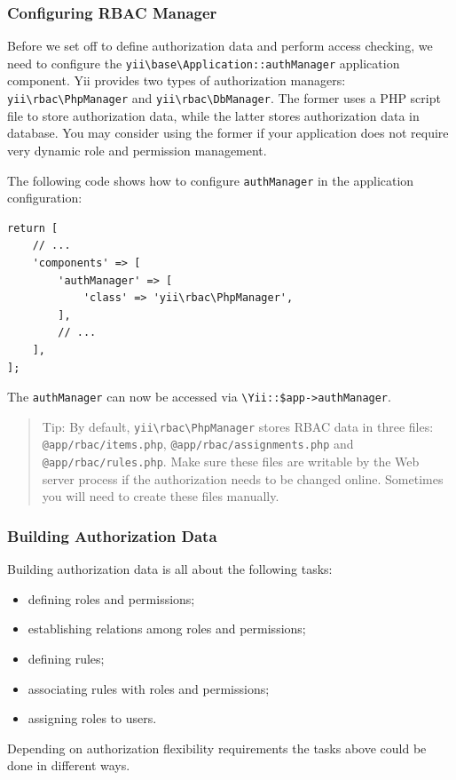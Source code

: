 \subsubsection{Configuring RBAC Manager}
Before we set off to define authorization data and perform access checking, we need to configure the
\texttt{yii{\allowbreak{}\textbackslash}base{\allowbreak{}\textbackslash}Application\allowbreak{}::\allowbreak{}authManager} application component. Yii provides two types of authorization managers:
\texttt{yii{\allowbreak{}\textbackslash}rbac{\allowbreak{}\textbackslash}PhpManager} and \texttt{yii{\allowbreak{}\textbackslash}rbac{\allowbreak{}\textbackslash}DbManager}. The former uses a PHP script file to store authorization
data, while the latter stores authorization data in database. You may consider using the former if your application
does not require very dynamic role and permission management.

The following code shows how to configure \lstinline|authManager| in the application configuration:

\lstset{language=php}\begin{lstlisting}
return [
    // ...
    'components' => [
        'authManager' => [
            'class' => 'yii\rbac\PhpManager',
        ],
        // ...
    ],
];
\end{lstlisting}
The \lstinline|authManager| can now be accessed via \lstinline|\Yii::$app->authManager|.

\begin{quote}Tip: By default, \texttt{yii{\allowbreak{}\textbackslash}rbac{\allowbreak{}\textbackslash}PhpManager} stores RBAC data in three files: \lstinline|@app/rbac/items.php|, \lstinline|@app/rbac/assignments.php| and \lstinline|@app/rbac/rules.php|.
  Make sure these files are writable by the Web server process if the authorization needs to be changed online.
  Sometimes you will need to create these files manually.

\end{quote}
\subsubsection{Building Authorization Data}
Building authorization data is all about the following tasks:

\begin{itemize}
\item defining roles and permissions;
\item establishing relations among roles and permissions;
\item defining rules;
\item associating rules with roles and permissions;
\item assigning roles to users.
\end{itemize}
Depending on authorization flexibility requirements the tasks above could be done in different ways.

